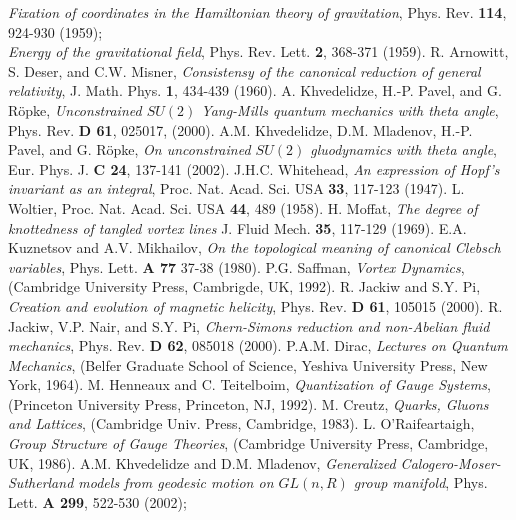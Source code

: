\documentclass[a4paper,12pt]{article}
\begin{document}
\begin{thebibliography}{99}
%
{\it Fixation of coordinates in the Hamiltonian theory of gravitation},
Phys. Rev. {\bf 114}, 924-930 (1959);\\
%
{\it Energy of the gravitational field},
Phys. Rev. Lett. {\bf 2}, 368-371 (1959).
%
R. Arnowitt, S. Deser, and C.W. Misner,
{\it Consistensy of the canonical reduction of general relativity},
J. Math. Phys. {\bf 1}, 434-439 (1960).
%
A. Khvedelidze, H.-P. Pavel, and  G. R\"opke,
{\it Unconstrained $SU(2)$ Yang-Mills quantum mechanics with theta angle},
Phys. Rev. {\bf D 61}, 025017, (2000).
%
A.M. Khvedelidze, D.M. Mladenov, H.-P. Pavel, and G. R\"opke,
{ \it On unconstrained $SU(2)$ gluodynamics with theta angle},
Eur. Phys. J. {\bf C 24}, 137-141 (2002).
%
J.H.C. Whitehead,
{\it An expression of Hopf's invariant as an integral},
Proc. Nat. Acad. Sci. USA {\bf 33}, 117-123 (1947).
%
L. Woltier,
Proc. Nat. Acad. Sci. USA {\bf 44}, 489 (1958).
%
H. Moffat, {\it The degree of knottedness of tangled vortex lines}
J. Fluid Mech. {\bf 35}, 117-129 (1969).
%
E.A. Kuznetsov and A.V. Mikhailov,
{\it On the topological meaning of canonical Clebsch variables},
Phys. Lett. {\bf A 77} 37-38 (1980).
%
P.G. Saffman,
{\it Vortex Dynamics},
(Cambridge University Press, Cambrigde, UK, 1992).
%
R. Jackiw and S.Y. Pi,
{\it Creation and evolution of magnetic helicity},
Phys. Rev. {\bf D 61}, 105015 (2000).
%
R. Jackiw, V.P. Nair, and S.Y. Pi,
{\it Chern-Simons reduction and non-Abelian fluid mechanics},
Phys. Rev. {\bf D 62}, 085018 (2000).
%
P.A.M. Dirac,
{\it Lectures on Quantum Mechanics},
(Belfer Graduate School of Science, Yeshiva University Press, New York, 1964).
%
M. Henneaux and C. Teitelboim,
{\it Quantization of Gauge Systems},
(Princeton University Press, Princeton, NJ, 1992).
%
M. Creutz,
{\it Quarks, Gluons and Lattices},
(Cambridge Univ. Press, Cambridge, 1983).
%
L. O'Raifeartaigh,
{\it Group Structure of Gauge Theories},
(Cambridge University Press, Cambridge, UK, 1986).
%
A.M. Khvedelidze and D.M. Mladenov,
{\it
Generalized Calogero-Moser-Sutherland models from geodesic motion on
$GL(n, {R})$ group manifold},
Phys. Lett. {\bf A 299}, 522-530 (2002);

\end{thebibliography}
\end{document}
